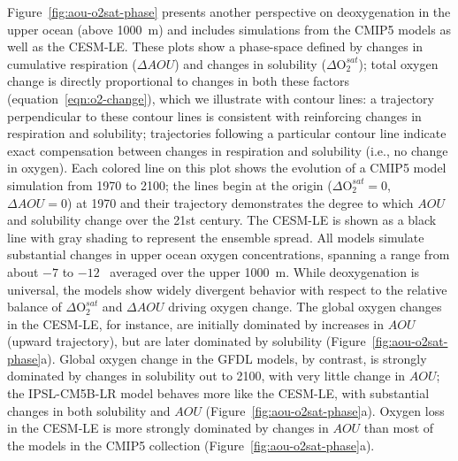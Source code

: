\documentclass{report_chapter}
\begin{document}
Figure~\ref{fig:aou-o2sat-phase} presents another perspective on deoxygenation in the upper ocean (above 1000~m) and includes simulations from the CMIP5 models as well as the CESM-LE.
These plots show a phase-space defined by changes in cumulative respiration ($\Delta AOU$) and changes in solubility ($\Delta\mathrm{O}_2^{sat}$); total oxygen change is directly proportional to changes in both these factors (equation~\ref{eqn:o2-change}), which we illustrate with contour lines: a trajectory perpendicular to these contour lines is consistent with reinforcing changes in respiration and solubility; trajectories following a particular contour line indicate exact compensation between changes in respiration and solubility (i.e., no change in oxygen).
Each colored line on this plot shows the evolution of a CMIP5 model simulation from 1970 to 2100; the lines begin at the origin ($\Delta\mathrm{O}_2^{sat} = 0$, $\Delta AOU=0$) at 1970 and their trajectory demonstrates the degree to which $AOU$ and solubility change over the 21st century.
The CESM-LE is shown as a black line with gray shading to represent the ensemble spread.
All models simulate substantial changes in upper ocean oxygen concentrations, spanning a range from about $-7$ to $-12$~\mmolmmm{} averaged over the upper 1000~m.
While deoxygenation is universal, the models show widely divergent behavior with respect to the relative balance of $\Delta\mathrm{O}_2^{sat}$ and $\Delta AOU$ driving oxygen change.
The global oxygen changes in the CESM-LE, for instance, are initially dominated by increases in $AOU$ (upward trajectory), but are later dominated by solubility (Figure~\ref{fig:aou-o2sat-phase}a).
Global oxygen change in the GFDL models, by contrast, is strongly dominated by changes in solubility out to 2100, with very little change in $AOU$; the IPSL-CM5B-LR model behaves more like the CESM-LE, with substantial changes in both solubility and $AOU$ (Figure~\ref{fig:aou-o2sat-phase}a).
Oxygen loss in the CESM-LE is more strongly dominated by changes in $AOU$ than most of the models in the CMIP5 collection (Figure~\ref{fig:aou-o2sat-phase}a).
\end{document}
